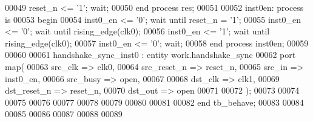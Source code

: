 \begin{DoxyCode}
00049         \textcolor{vhdlchar}{reset_n} \textcolor{vhdlchar}{<=} \textcolor{vhdlchar}{'}\textcolor{vhdllogic}{}\textcolor{vhdllogic}{1}\textcolor{vhdlchar}{'}; \textcolor{keywordflow}{wait};
00050     \textcolor{keywordflow}{end} \textcolor{keywordflow}{process} \textcolor{vhdlchar}{res};
00051    
00052     inst0en: \textcolor{keywordflow}{process} \textcolor{keywordflow}{is}
00053 \textcolor{vhdlkeyword}{    begin}
00054         inst0\_en <= '0'; \textcolor{keywordflow}{wait} \textcolor{keywordflow}{until} reset\_n = '1';
00055       inst0\_en <= '0'; \textcolor{keywordflow}{wait} \textcolor{keywordflow}{until} rising\_edge(clk0);
00056         inst0\_en <= '1'; \textcolor{keywordflow}{wait} \textcolor{keywordflow}{until} rising\_edge(clk0);
00057       inst0\_en <= '0'; \textcolor{keywordflow}{wait};
00058     \textcolor{keywordflow}{end} \textcolor{keywordflow}{process} \textcolor{vhdlchar}{inst0en};
00059    
00060    
00061    handshake\_sync\_inst0 : \textcolor{keywordflow}{entity} work.handshake_sync
00062    \textcolor{keywordflow}{port} \textcolor{keywordflow}{map}(
00063       src_clk        => clk0,
00064       src_reset_n    => reset_n,
00065       src_in         => inst0_en,
00066       src_busy       => \textcolor{keywordflow}{open},
00067 
00068       dst_clk        => clk1,
00069       dst_reset_n    => reset_n,
00070       dst_out        => \textcolor{keywordflow}{open}
00071       
00072         \textcolor{vhdlchar}{)};
00073     
00074 
00075    
00076 
00077 
00078     
00079 
00080     
00081     
00082     \textcolor{keywordflow}{end} \textcolor{vhdlchar}{tb\_behave};
00083    
00084    
00085   
00086   
00087 
00088 
00089   
\end{DoxyCode}
